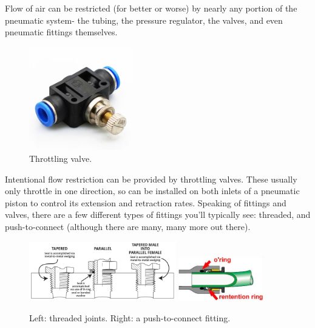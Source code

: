 Flow of air can be restricted (for better or worse) by nearly any portion of the pneumatic system- the tubing, the pressure regulator, the valves, and even pneumatic fittings themselves.

\begin{figure}[H]
	\includegraphics[width=0.4\textwidth]{imgs/pneumatic_throttle.jpeg}
	\caption{Throttling valve.}
\end{figure}

Intentional flow restriction can be provided by throttling valves. These usually only throttle in one direction, so can be installed on both inlets of a pneumatic piston to control its extension and retraction rates. Speaking of fittings and valves, there are a few different types of fittings you'll typically see: threaded, and push-to-connect (although there are many, many more out there).

\begin{figure}[H]
	\includegraphics[width=0.57\textwidth]{imgs/taper_vs_parallel_threads.jpeg}
	\qquad
	\includegraphics[width=0.33\textwidth]{imgs/push_to_connect_fitting.png}
	\caption{Left: threaded joints. Right: a push-to-connect fitting.}
\end{figure}

